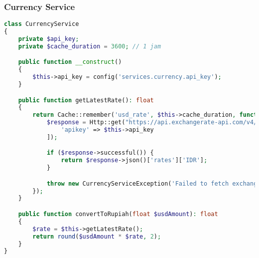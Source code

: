 \documentclass[a4paper]{report}
\begin{document}
\subsubsection{Currency Service}
\begin{lstlisting}[language=PHP]
class CurrencyService
{
    private $api_key;
    private $cache_duration = 3600; // 1 jam

    public function __construct()
    {
        $this->api_key = config('services.currency.api_key');
    }

    public function getLatestRate(): float
    {
        return Cache::remember('usd_rate', $this->cache_duration, function () {
            $response = Http::get("https://api.exchangerate-api.com/v4/latest/USD", [
                'apikey' => $this->api_key
            ]);

            if ($response->successful()) {
                return $response->json()['rates']['IDR'];
            }

            throw new CurrencyServiceException('Failed to fetch exchange rate');
        });
    }

    public function convertToRupiah(float $usdAmount): float
    {
        $rate = $this->getLatestRate();
        return round($usdAmount * $rate, 2);
    }
}
\end{lstlisting}
\end{document}
